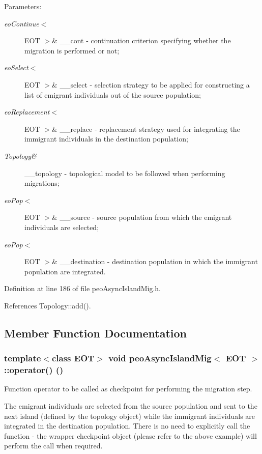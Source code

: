 \begin{Desc}
\item[Parameters:]
\begin{description}
\item[{\em eo\-Continue$<$}]EOT $>$\& \_\-\_\-cont - continuation criterion specifying whether the migration is performed or not; \item[{\em eo\-Select$<$}]EOT $>$\& \_\-\_\-select - selection strategy to be applied for constructing a list of emigrant individuals out of the source population; \item[{\em eo\-Replacement$<$}]EOT $>$\& \_\-\_\-replace - replacement strategy used for integrating the immigrant individuals in the destination population; \item[{\em Topology\&}]\_\-\_\-topology - topological model to be followed when performing migrations; \item[{\em eo\-Pop$<$}]EOT $>$\& \_\-\_\-source - source population from which the emigrant individuals are selected; \item[{\em eo\-Pop$<$}]EOT $>$\& \_\-\_\-destination - destination population in which the immigrant population are integrated. \end{description}
\end{Desc}


Definition at line 186 of file peo\-Async\-Island\-Mig.h.

References Topology::add().

\subsection{Member Function Documentation}
\subsubsection{\setlength{\rightskip}{0pt plus 5cm}template$<$class EOT$>$ void {\bf peo\-Async\-Island\-Mig}$<$ EOT $>$::operator() ()}\label{classpeo_async_island_mig_13581e54425727a7f785ca8a6df527b5}


Function operator to be called as checkpoint for performing the migration step. 

The emigrant individuals are selected from the source population and sent to the next island (defined by the topology object) while the immigrant individuals are integrated in the destination population. There is no need to explicitly call the function - the wrapper checkpoint object (please refer to the above example) will perform the call when required. 

